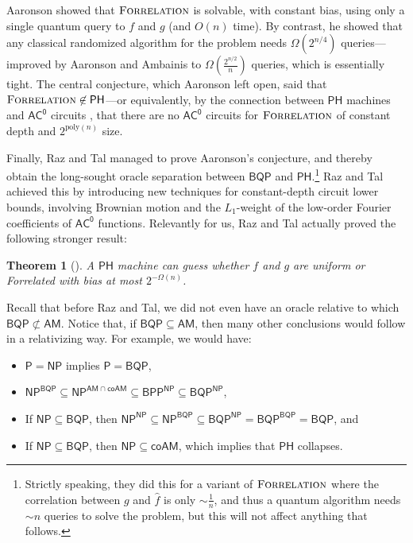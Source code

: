 \documentclass[11pt]{article}%
\newtheorem{theorem}{Theorem}
\newcommand{\poly}{\mathrm{poly}}
\newcommand{\Forrelation}{\normalfont\textsc{Forrelation}}
\begin{document}
Aaronson \cite{Aar10} showed that $\Forrelation$ is solvable, with constant bias, using only a single quantum query to $f$ and $g$ (and $O(n)$ time).  By contrast, he showed that any classical randomized algorithm for the problem needs $\Omega\left(2^{n/4}\right)$ queries---improved by Aaronson and Ambainis \cite{AA18} to $\Omega\left(\frac{2^{n/2}}{n}\right)$ queries, which is essentially tight.  The central conjecture, which Aaronson left open, said that $\Forrelation \not\in \mathsf{PH}$---or equivalently, by the connection between $\mathsf{PH}$ machines and $\mathsf{AC^0}$ circuits \cite{FSS84}, that there are no $\mathsf{AC^0}$ circuits for $\Forrelation$ of constant depth and $2^{\poly(n)}$ size.

Finally, Raz and Tal \cite{RT19} managed to prove Aaronson's conjecture, and thereby obtain the long-sought oracle separation between $\mathsf{BQP}$ and $\mathsf{PH}$.\footnote{Strictly speaking, they did this for a variant of $\Forrelation$ where the correlation between $g$ and $\hat{f}$ is only $\sim \frac{1}{n}$, and thus a quantum algorithm needs $\sim n$ queries to solve the problem, but this will not affect anything that follows.}  Raz and Tal achieved this by introducing new techniques for constant-depth circuit lower bounds, involving Brownian motion and the $L_1$-weight of the low-order
Fourier coefficients of $\mathsf{AC^0}$ functions.  Relevantly for us, Raz and Tal actually proved the following stronger result:

\begin{theorem}[\cite{RT19}]
\label{thm:raz-tal-informal-intro}
A $\mathsf{PH}$ machine can guess whether $f$ and $g$ are uniform or Forrelated with bias at most $2^{-\Omega(n)}$.
\end{theorem}

Recall that before Raz and Tal, we did not even have an oracle
relative to which $\mathsf{BQP} \not\subset \mathsf{AM}$.  Notice that, if $\mathsf{BQP} \subseteq \mathsf{AM}$, then many other conclusions would follow in a relativizing way.  For example, we would have:

\begin{itemize}
\item $\mathsf{P} = \mathsf{NP}$ implies $\mathsf{P} = \mathsf{BQP}$,
\item $\mathsf{NP}^\mathsf{BQP} \subseteq \mathsf{NP}^{\mathsf{AM} \cap \mathsf{coAM}} \subseteq \mathsf{BPP}^\mathsf{NP} \subseteq \mathsf{BQP}^\mathsf{NP}$,
\item If $\mathsf{NP} \subseteq \mathsf{BQP}$, then $\mathsf{NP}^\mathsf{NP} \subseteq \mathsf{NP}^\mathsf{BQP} \subseteq \mathsf{BQP}^\mathsf{NP} = \mathsf{BQP}^\mathsf{BQP} = \mathsf{BQP}$, and
\item If $\mathsf{NP} \subseteq \mathsf{BQP}$, then $\mathsf{NP} \subseteq \mathsf{coAM}$, which implies that $\mathsf{PH}$ collapses.
\end{itemize}
\end{document}
